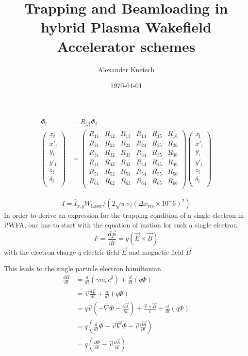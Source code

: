 \documentclass{thesis}
\title{Trapping and Beamloading in hybrid Plasma Wakefield Accelerator schemes}
\author{Alexander Knetsch}
\date{\today}
\begin{document}
\maketitle
\tableofcontents
\begin{equation}
\begin{split}
\Phi_\mathrm{f}&=R_\mathrm{i,j} \Phi_\mathrm{f} \\
\begin{pmatrix}
x_\mathrm{f}\\
x'_\mathrm{f}\\
y_\mathrm{f}\\
y'_\mathrm{f}\\
z_\mathrm{f}\\
\delta_\mathrm{f}\\
\end{pmatrix}
&=
\begin{pmatrix}
R_{11}&R_{12}&R_{13}&R_{14}&R_{15}&R_{16}\\
R_{21}&R_{22}&R_{23}&R_{24}&R_{25}&R_{26}\\
R_{31}&R_{32}&R_{33}&R_{34}&R_{35}&R_{36}\\
R_{41}&R_{42}&R_{43}&R_{44}&R_{45}&R_{46}\\
R_{51}&R_{52}&R_{53}&R_{54}&R_{55}&R_{56}\\
R_{61}&R_{62}&R_{63}&R_{64}&R_{65}&R_{66}\\
\end{pmatrix}
\begin{pmatrix}
x_\mathrm{i}\\
x'_\mathrm{i}\\
y_\mathrm{i}\\
y'_\mathrm{i}\\
z_\mathrm{i}\\
\delta_\mathrm{i}\\
\end{pmatrix}
\end{split}
\end{equation}


$$I=\hat{I}_{x,y}W_\mathrm{Laser}/(2\sqrt{\pi}\sigma_t(\Delta x_\mathrm{res}\times10^-6)^2)$$
In order to derive an expression for the trapping condition of a single electron in PWFA, one has to start with the equation of motion for such a single electron. 
\begin{equation}
F=\frac{d\vec{p}}{dt}=q(\vec{E}\times \vec{B})
\end{equation}
with the electron charge $q$ electric field $\vec{E}$ and magnetic field $\vec{B}$


This leads to the single particle electron hamiltonian. 
\begin{align}
\frac{dH}{dt}&=\frac{d}{dt} (\gamma m_e c^2)+\frac{d}{dt}(q\Phi)\\
&=\vec{v}\frac{d\vec{p}}{dt}+\frac{d}{dt}(q\Phi)\\
&=q\vec{v}(-\nabla \Phi-\frac{\partial \vec{A}}{\partial t})+\frac{\vec{v}\times\vec{B}}{c}+\frac{d}{dt}(q\Phi)\\
&=q(\frac{d}{dt}\Phi-\vec{v}\vec{\nabla}\Phi-\vec{v}\frac{\partial \vec{A}}{\partial t})\\
&=q(\frac{\partial \Phi}{\partial t}-\vec{v}\frac{\partial \vec{A}}{\partial t})
\end{align}
\end{document}
